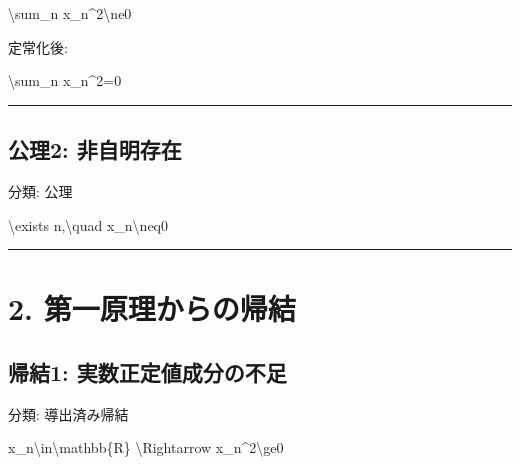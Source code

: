 \documentclass[
  a4paper]{ltjsarticle}
\newenvironment{Shaded}{}{}
\newcommand{\NormalTok}[1]{#1}
\begin{document}
\begin{Shaded}
\begin{Highlighting}[]
\NormalTok{\textbackslash{}sum\_n x\_n\^{}2\textbackslash{}ne0}
\end{Highlighting}
\end{Shaded}

定常化後:

\begin{Shaded}
\begin{Highlighting}[]
\NormalTok{\textbackslash{}sum\_n x\_n\^{}2=0}
\end{Highlighting}
\end{Shaded}

\begin{center}\rule{0.5\linewidth}{0.5pt}\end{center}

\subsection{公理2:
非自明存在}\label{ux516cux74062-ux975eux81eaux660eux5b58ux5728}

分類: 公理

\begin{Shaded}
\begin{Highlighting}[]
\NormalTok{\textbackslash{}exists n,\textbackslash{}quad x\_n\textbackslash{}neq0}
\end{Highlighting}
\end{Shaded}

\begin{center}\rule{0.5\linewidth}{0.5pt}\end{center}

\section{2.
第一原理からの帰結}\label{ux7b2cux4e00ux539fux7406ux304bux3089ux306eux5e30ux7d50}

\subsection{帰結1:
実数正定値成分の不足}\label{ux5e30ux7d501-ux5b9fux6570ux6b63ux5b9aux5024ux6210ux5206ux306eux4e0dux8db3}

分類: 導出済み帰結

\begin{Shaded}
\begin{Highlighting}[]
\NormalTok{x\_n\textbackslash{}in\textbackslash{}mathbb\{R\}}
\NormalTok{\textbackslash{}Rightarrow}
\NormalTok{x\_n\^{}2\textbackslash{}ge0}
\end{Highlighting}
\end{Shaded}
\end{document}
